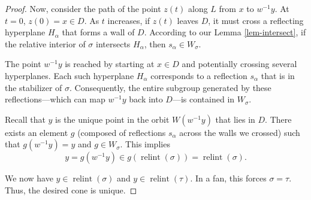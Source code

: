 \documentclass{amsart}
\theoremstyle{definition}
\theoremstyle{remark}
\numberwithin{equation}{section}
\begin{document}
\begin{proof}
Now, consider the path of the point $z(t)$ along $L$ from $x$ to $w^{-1}y$. 
At $t=0$, $z(0) = x \in D$. 
As $t$ increases, if $z(t)$ leaves $D$, it must cross a reflecting hyperplane $H_\alpha$ that forms a wall of $D$.
According to our Lemma \ref{lem-intersect}, if the relative interior of $\sigma$ intersects $H_\alpha$, then $s_\alpha \in W_\sigma$.

The point $w^{-1}y$ is reached by starting at $x \in D$ and potentially crossing several hyperplanes. Each such hyperplane $H_{\alpha}$ corresponds to a reflection $s_{\alpha}$ that is in the stabilizer of $\sigma$. Consequently, the entire subgroup generated by these reflections---which can map $w^{-1}y$ back into $D$---is contained in $W_\sigma$.

Recall that $y$ is the unique point in the orbit $W(w^{-1}y)$ that lies in $D$. There exists an element $g$ (composed of reflections $s_{\alpha}$ across the walls we crossed) such that $g(w^{-1}y) = y$ and $g \in W_\sigma$.
This implies
$$y = g(w^{-1}y) \in g(\operatorname{relint}(\sigma)) = \operatorname{relint}(\sigma).$$

We now have $y \in \operatorname{relint}(\sigma)$ and $y \in \operatorname{relint}(\tau)$. In a fan, this forces $\sigma = \tau$. Thus, the desired cone is unique.
\end{proof}
\end{document}
